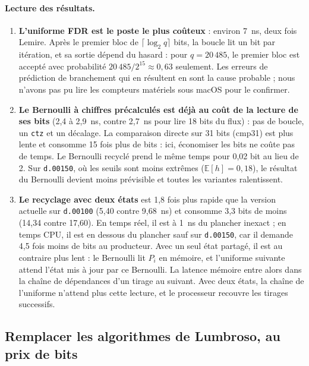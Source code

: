 \documentclass[11pt,a4paper]{article}
\newcommand{\code}[1]{\texttt{#1}}
\begin{document}
\paragraph{Lecture des résultats.}
\begin{enumerate}
\item \textbf{L'uniforme FDR est le poste le plus coûteux} : environ 7~ns, deux fois
  Lemire. Après le premier bloc de $\lceil \log_2 q \rceil$ bits, la boucle lit un bit
  par itération, et sa sortie dépend du hasard : pour $q = 20\,485$, le premier bloc est
  accepté avec probabilité $20\,485/2^{15} \approx 0{,}63$ seulement. Les erreurs de
  prédiction de branchement qui en résultent en sont la cause probable ; nous n'avons
  pas pu lire les compteurs matériels sous macOS pour le confirmer.
\item \textbf{Le Bernoulli à chiffres précalculés est déjà au coût de la lecture de ses
  bits} (2,4 à 2,9~ns, contre 2,7~ns pour lire 18 bits du flux) : pas de boucle, un
  \code{ctz} et un décalage. La comparaison directe sur 31 bits (cmp31) est plus lente
  et consomme 15 fois plus de bits : ici, économiser les bits ne coûte pas de temps. Le
  Bernoulli recyclé prend le même temps pour 0,02 bit au lieu de 2. Sur \code{d.00150},
  où les seuils sont moins extrêmes ($\mathbb{E}[h] = 0{,}18$), le résultat du Bernoulli
  devient moins prévisible et toutes les variantes ralentissent.
\item \textbf{Le recyclage avec deux états} est 1,8 fois plus rapide que la version
  actuelle sur \code{d.00100} (5,40 contre 9,68~ns) et consomme 3,3 bits de moins
  (14,34 contre 17,60). En temps réel, il est à 1~ns du plancher inexact ; en temps CPU,
  il est en dessous du plancher sauf sur \code{d.00150}, car il demande 4,5 fois moins
  de bits au producteur. Avec un seul état partagé, il est au contraire plus lent : le Bernoulli
  lit $P_i$ en mémoire, et l'uniforme suivante attend l'état mis à jour par ce
  Bernoulli. La latence mémoire entre alors dans la chaîne de dépendances d'un tirage
  au suivant. Avec deux états, la chaîne de l'uniforme n'attend plus cette lecture, et
  le processeur recouvre les tirages successifs.
\end{enumerate}

\subsection{Remplacer les algorithmes de Lumbroso, au prix de bits}
\end{document}
